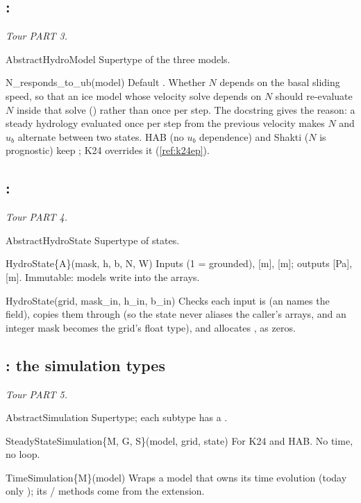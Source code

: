 \subsection{: }\label{ref:model}
\emph{Tour PART 3.}
\begin{fnlist}
\item[AbstractHydroModel] Supertype of the three models.
\item[N\_responds\_to\_ub(model)] Default . Whether $N$ depends on the basal sliding speed, so that an ice model whose
  velocity solve depends on $N$ should re-evaluate $N$ inside that solve () rather than once per step. The
  docstring gives the reason: a steady hydrology evaluated once per step from the previous velocity makes $N$ and $u_b$
  alternate between two states. HAB (no $u_b$ dependence) and Shakti ($N$ is prognostic) keep ; K24 overrides it
  (\ref{ref:k24ep}).
\end{fnlist}

\subsection{: }\label{ref:state}
\emph{Tour PART 4.}
\begin{fnlist}
\item[AbstractHydroState] Supertype of states.
\item[HydroState\{A\}(mask, h, b, N, W)] Inputs  (1 = grounded),  [m],  [m]; outputs  [Pa],  [m].
  Immutable: models write into the arrays.
\item[HydroState(grid, mask\_in, h\_in, b\_in)] Checks each input is  (an  names the field), copies
  them through  (so the state never aliases the caller's arrays, and an integer mask becomes the grid's float
  type), and allocates ,  as zeros.
\end{fnlist}

\subsection{: the simulation types}\label{ref:simulation}
\emph{Tour PART 5.}
\begin{fnlist}
\item[AbstractSimulation] Supertype; each subtype has a .
\item[SteadyStateSimulation\{M, G, S\}(model, grid, state)] For K24 and HAB. No time, no loop.
\item[TimeSimulation\{M\}(model)] Wraps a model that owns its time evolution (today only ); its
  / methods come from the extension.
\end{fnlist}

